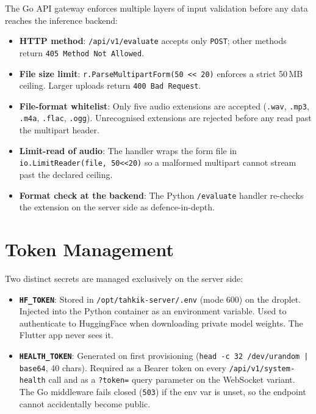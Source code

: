 The Go API gateway enforces multiple layers of input validation before any data reaches the inference backend:

\begin{emeraldbox}[title=Validation Rules]
\begin{itemize}
  \item \textbf{HTTP method}: \texttt{/api/v1/evaluate} accepts only \texttt{POST}; other methods return \texttt{405 Method Not Allowed}.
  \item \textbf{File size limit}: \texttt{r.ParseMultipartForm(50 << 20)} enforces a strict 50\,MB ceiling. Larger uploads return \texttt{400 Bad Request}.
  \item \textbf{File-format whitelist}: Only five audio extensions are accepted (\texttt{.wav}, \texttt{.mp3}, \texttt{.m4a}, \texttt{.flac}, \texttt{.ogg}). Unrecognised extensions are rejected before any read past the multipart header.
  \item \textbf{Limit-read of audio}: The handler wraps the form file in \texttt{io.LimitReader(file, 50<<20)} so a malformed multipart cannot stream past the declared ceiling.
  \item \textbf{Format check at the backend}: The Python \texttt{/evaluate} handler re-checks the extension on the server side as defence-in-depth.
\end{itemize}
\end{emeraldbox}

\section{Token Management}

Two distinct secrets are managed exclusively on the server side:

\begin{infobox}[title=Token Security Architecture]
\begin{itemize}
  \item \textbf{\texttt{HF\_TOKEN}}: Stored in \texttt{/opt/tahkik-server/.env} (mode 600) on the droplet. Injected into the Python container as an environment variable. Used to authenticate to HuggingFace when downloading private model weights. The Flutter app never sees it.
  \item \textbf{\texttt{HEALTH\_TOKEN}}: Generated on first provisioning (\texttt{head -c 32 /dev/urandom | base64}, 40 chars). Required as a Bearer token on every \texttt{/api/v1/system-health} call and as a \texttt{?token=} query parameter on the WebSocket variant. The Go middleware fails closed (\texttt{503}) if the env var is unset, so the endpoint cannot accidentally become public.
\end{itemize}
\end{infobox}

